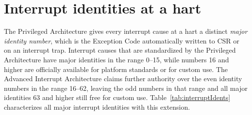 \section{Interrupt identities at a hart}

The {\RISCV} Privileged Architecture gives every interrupt cause at a
hart a distinct \emph{major identity number}, which is the Exception
Code automatically written to CSR  or  on an
interrupt trap.
Interrupt causes that are standardized by the Privileged Architecture
have major identities in the range 0--15, while numbers 16 and higher
are officially available for platform standards or for custom use.
The Advanced Interrupt Architecture claims further authority over the
even identity numbers in the range 16--62, leaving the odd numbers in
that range and all major identities 63 and higher still free for custom
use.
Table~\ref{tab:interruptIdents} characterizes all major interrupt
identities with this extension.

